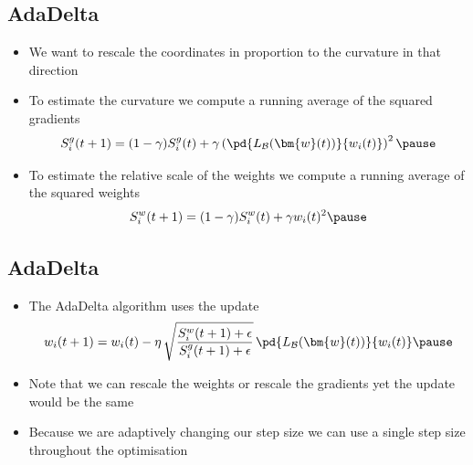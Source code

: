 
\begin{slide}
  \section[-2]{AdaDelta}

  \begin{PauseHighLight}
    \begin{itemize}
    \item We want to rescale the coordinates in proportion to the
      curvature in that direction\pause
    \item To estimate the curvature we compute a running average of
      the squared gradients
      \begin{align*}
        S^g_i(t+1) = (1-\gamma) S^g_i(t) + \gamma \left(
        \pd{L_{\mathcal{B}}(\bm{w}(t))}{w_i(t)} \right)^2\pause
      \end{align*}
    \item To estimate the relative scale of the weights we compute a
      running average of the squared weights
      \begin{align*}
        S^w_i(t+1) = (1-\gamma) S^w_i(t) + \gamma w_i(t)^2\pause
      \end{align*}
     \end{itemize}
  \end{PauseHighLight}

\end{slide}


\begin{slide}
\section{AdaDelta}

\begin{PauseHighLight}
  \begin{itemize}
  \item The AdaDelta algorithm uses the update
    \begin{align*}
       w_i(t+1)
        = w_i(t) - \eta \,
        \sqrt{\frac{S^w_i(t+1)+\epsilon}{S^g_i(t+1)+\epsilon}}\,
        \pd{L_{\mathcal{B}}(\bm{w}(t))}{w_i(t)}\pause
    \end{align*}
  \item Note that we can rescale the weights or rescale the
    gradients yet the update would be the same\pause
  \item Because we are adaptively changing our step size we can use a
    single step size throughout the optimisation\pause
  \end{itemize}
\end{PauseHighLight}

\end{slide}

